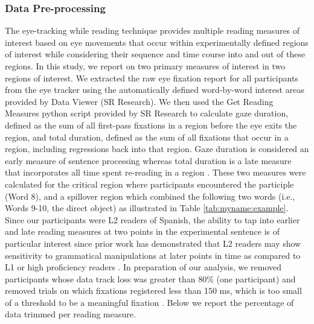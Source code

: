 \documentclass[output=paper,colorlinks,citecolor=brown]{langscibook}
\begin{document}
\subsubsection{Data Pre-processing}
The eye-tracking while reading technique provides multiple reading measures of interest based on eye movements that occur within experimentally defined regions of interest while considering their sequence and time course into and out of these regions. In this study, we report on two primary measures of interest in two regions of interest. We extracted the raw eye fixation report for all participants from the eye tracker using the automatically defined word-by-word interest areas provided by Data Viewer (SR Research). We then used the Get Reading Measures python script provided by SR Research to calculate gaze duration, defined as the sum of all first-pass fixations in a region before the eye exits the region, and total duration, defined as the sum of all fixations that occur in a region, including regressions back into that region. Gaze duration is considered an early measure of sentence processing whereas total duration is a late measure that incorporates all time spent re-reading in a region \citep{Rayner1998}. These two measures were calculated for the critical region where participants encountered the participle (Word 8), and a spillover region which combined the following two words (i.e., Words 9-10, the direct object) as illustrated in Table \ref{tab:myname:example}. Since our participants were L2 readers of Spanish, the ability to tap into earlier and late reading measures at two points in the experimental sentence is of particular interest since prior work has demonstrated that L2 readers may show sensitivity to grammatical manipulations at later points in time as compared to L1 or high proficiency readers \citep{Avery2019,Godfroid2019}. In preparation of our analysis, we removed participants whose data track loss was greater than 80\% (one participant) and removed trials on which fixations registered less than 150 ms, which is too small of a threshold to be a meaningful fixation \citep{Rayner1998}. Below we report the percentage of data trimmed per reading measure.
\end{document}
